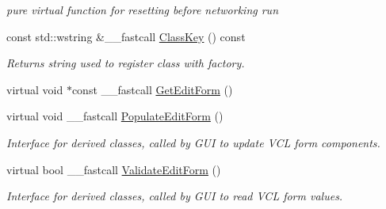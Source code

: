 \begin{DoxyCompactItemize}
\begin{DoxyCompactList}\small\item\em pure virtual function for resetting before networking run \end{DoxyCompactList}\item 
const std\+::wstring \&\+\_\+\+\_\+fastcall \hyperlink{class_t_playback_waveform_ad5bb30fcf319f49b1119881d857262fa}{Class\+Key} () const 
\begin{DoxyCompactList}\small\item\em Returns string used to register class with factory. \end{DoxyCompactList}\item 
virtual void $\ast$const \+\_\+\+\_\+fastcall \hyperlink{class_t_playback_waveform_a1fcb2c8d237e2418080fdefeb3e13f73}{Get\+Edit\+Form} ()
\item 
\hypertarget{class_t_playback_waveform_ab97a5f8d756b7771fc58a6ac068c214c}{virtual void \+\_\+\+\_\+fastcall \hyperlink{class_t_playback_waveform_ab97a5f8d756b7771fc58a6ac068c214c}{Populate\+Edit\+Form} ()}\label{class_t_playback_waveform_ab97a5f8d756b7771fc58a6ac068c214c}

\begin{DoxyCompactList}\small\item\em Interface for derived classes, called by G\+U\+I to update V\+C\+L form components. \end{DoxyCompactList}\item 
\hypertarget{class_t_playback_waveform_a037a040342eb225bbedc6bb746827b58}{virtual bool \+\_\+\+\_\+fastcall \hyperlink{class_t_playback_waveform_a037a040342eb225bbedc6bb746827b58}{Validate\+Edit\+Form} ()}\label{class_t_playback_waveform_a037a040342eb225bbedc6bb746827b58}

\begin{DoxyCompactList}\small\item\em Interface for derived classes, called by G\+U\+I to read V\+C\+L form values. \end{DoxyCompactList}\end{DoxyCompactItemize}
